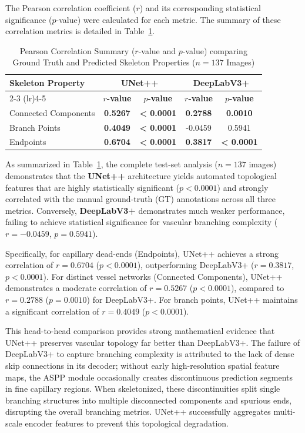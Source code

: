 The Pearson correlation coefficient ($r$) and its corresponding statistical significance ($p$-value) were calculated for each metric. The summary of these correlation metrics is detailed in Table~\ref{tab:pearson_correlation_summary}.

\begin{table}[h]
\centering
\caption{Pearson Correlation Summary ($r$-value and $p$-value) comparing Ground Truth and Predicted Skeleton Properties ($n = 137$ Images)}
\label{tab:pearson_correlation_summary}
\begin{tabular}{@{}lcccc@{}}
\toprule
\textbf{Skeleton Property} & \multicolumn{2}{c}{\textbf{UNet++}} & \multicolumn{2}{c}{\textbf{DeepLabV3+}} \\
\cmidrule(lr){2-3} \cmidrule(lr){4-5}
 & \textbf{$r$-value} & \textbf{$p$-value} & \textbf{$r$-value} & \textbf{$p$-value} \\ \midrule
Connected Components & \textbf{0.5267} & \textbf{< 0.0001} & \textbf{0.2788} & \textbf{0.0010} \\
Branch Points & \textbf{0.4049} & \textbf{< 0.0001} & -0.0459 & 0.5941 \\
Endpoints & \textbf{0.6704} & \textbf{< 0.0001} & \textbf{0.3817} & \textbf{< 0.0001} \\
\bottomrule
\end{tabular}
\end{table}

As summarized in Table~\ref{tab:pearson_correlation_summary}, the complete test-set analysis ($n = 137$ images) demonstrates that the \textbf{UNet++} architecture yields automated topological features that are highly statistically significant ($p < 0.0001$) and strongly correlated with the manual ground-truth (GT) annotations across all three metrics. Conversely, \textbf{DeepLabV3+} demonstrates much weaker performance, failing to achieve statistical significance for vascular branching complexity ($r = -0.0459$, $p = 0.5941$).

Specifically, for capillary dead-ends (Endpoints), UNet++ achieves a strong correlation of $r = 0.6704$ ($p < 0.0001$), outperforming DeepLabV3+ ($r = 0.3817$, $p < 0.0001$). For distinct vessel networks (Connected Components), UNet++ demonstrates a moderate correlation of $r = 0.5267$ ($p < 0.0001$), compared to $r = 0.2788$ ($p = 0.0010$) for DeepLabV3+. For branch points, UNet++ maintains a significant correlation of $r = 0.4049$ ($p < 0.0001$). 

This head-to-head comparison provides strong mathematical evidence that UNet++ preserves vascular topology far better than DeepLabV3+. The failure of DeepLabV3+ to capture branching complexity is attributed to the lack of dense skip connections in its decoder; without early high-resolution spatial feature maps, the ASPP module occasionally creates discontinuous prediction segments in fine capillary regions. When skeletonized, these discontinuities split single branching structures into multiple disconnected components and spurious ends, disrupting the overall branching metrics. UNet++ successfully aggregates multi-scale encoder features to prevent this topological degradation.

